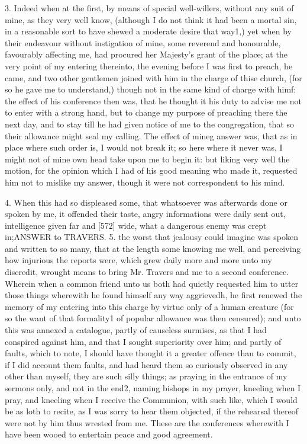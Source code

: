 3. Indeed when at the first, by means of special well-willers, without any suit of mine, as they very well know, (although I do not think it had been a mortal sin, in a reasonable sort to have shewed a moderate desire that way1,) yet when by their endeavour without instigation of mine, some reverend and honourable, favourably affecting me, had procured her Majesty’s grant of the place; at the very point of my entering thereinto, the evening before I was first to preach, he came, and two other gentlemen joined with him in the charge of thise church, (for so he gave me to understand,) though not in the same kind of charge with himf: the effect of his conference then was, that he thought it his duty to advise me not to enter with a strong hand, but to change my purpose of preaching there the next day, and to stay till he had given notice of me to the congregation, that so their allowance might seal my calling. The effect of mineg answer was, that as in place where such order is, I would not break it; so here where it never was, I might not of mine own head take upon me to begin it: but liking very well the motion, for the opinion which I had of his good meaning who made it, requested him not to mislike my answer, though it were not correspondent to his mind.

4. When this had so displeased some, that whatsoever was afterwards done or spoken by me, it offended their taste, angry informations were daily sent out, intelligence given far and [572] wide, what a dangerous enemy was crept in;ANSWER to TRAVERS. 5. the worst that jealousy could imagine was spoken and written to so many, that at the length some knowing me well, and perceiving how injurious the reports were, which grew daily more and more unto my discredit, wrought means to bring Mr. Travers and me to a second conference. Wherein when a common friend unto us both had quietly requested him to utter those things wherewith he found himself any way aggrievedh, he first renewed the memory of my entering into this charge by virtue only of a human creature (for so the want of that formality1 of popular allowance was then censured); and unto this was annexed a catalogue, partly of causeless surmises, as that I had conspired against him, and that I sought superiority over him; and partly of faults, which to note, I should have thought it a greater offence than to commit, if I did account them faults, and had heard them so curiously observed in any other than myself, they are such silly things; as praying in the entrance of my sermons only, and not in the end2, naming bishops in my prayer, kneeling when I pray, and kneeling when I receive the Communion, with such like, which I would be as loth to recite, as I was sorry to hear them objected, if the rehearsal thereof were not by him thus wrested from me. These are the conferences wherewith I have been wooed to entertain peace and good agreement.

